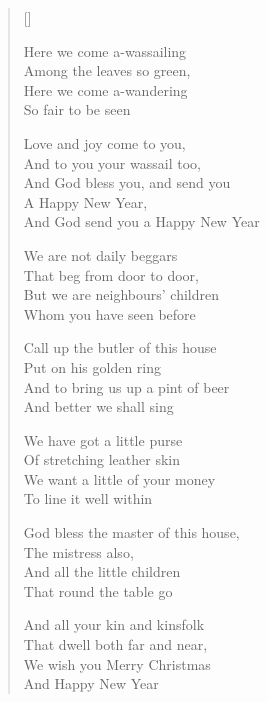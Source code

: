 \pagebreak
\settowidth{\versewidth}{But we are neighbours' children}
\begin{verse}[\versewidth]

Here we come a-wassailing\\
Among the leaves so green,\\
Here we come a-wandering\\
So fair to be seen


\begin{chorus}
Love and joy come to you,\\
And to you your wassail too,\\
And God bless you, and send you \\
A Happy New Year,\\
And God send you a Happy New Year
\end{chorus}

We are not daily beggars\\
That beg from door to door,\\
But we are neighbours' children\\
Whom you have seen before


Call up the butler of this house\\
Put on his golden ring\\
And to bring us up a pint of beer\\
And better we shall sing


We have got a little purse\\
Of stretching leather skin\\
We want a little of your money\\
To line it well within


God bless the master of this house,\\
The mistress also,\\
And all the little children\\
That round the table go


And all your kin and kinsfolk\\
That dwell both far and near,\\
We wish you Merry Christmas\\
And Happy New Year
\end{verse}

